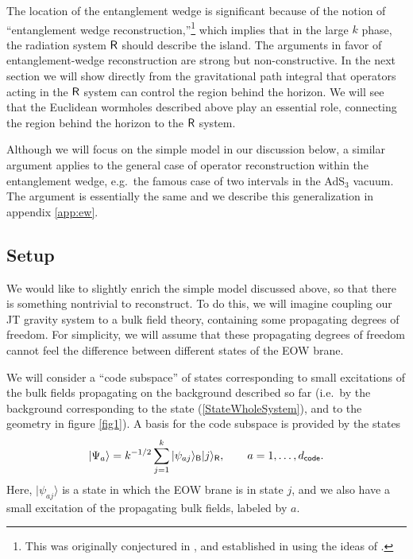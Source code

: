 \documentclass[11pt]{article}
\newcommand{\be}{\begin{equation}}
\newcommand{\ee}{\end{equation}}
\numberwithin{equation}{section}
\begin{document}
The location of the entanglement wedge is significant because of the notion of ``entanglement wedge reconstruction,''\footnote{This was originally conjectured in \cite{Headrick:2014cta,Czech:2012bh,Wall:2012uf}, and established in \cite{Jafferis:2015del,Dong:2016eik,Cotler:2017erl} using the ideas of \cite{Faulkner:2013ana}.} which implies that in the large $k$ phase, the radiation system $\sf{R}$ should describe the island. The arguments in favor of entanglement-wedge reconstruction \cite{Faulkner:2013ana,Jafferis:2015del,Dong:2016eik,Cotler:2017erl} are strong but non-constructive. In the next section we will show directly from the gravitational path integral that operators acting in the $\sf{R}$ system can control the region behind the horizon. We will see that the Euclidean wormholes described above play an essential role, connecting the region behind the horizon to the $\sf{R}$ system.

Although we will focus on the simple model in our discussion below, a similar argument applies to the general case of operator reconstruction within the entanglement wedge, e.g.~the famous case of two intervals in the AdS$_3$ vacuum. The argument is essentially the same and we describe this generalization in appendix \ref{app:ew}.

\subsection{Setup}
We would like to slightly enrich the simple model discussed above, so that there is something nontrivial to reconstruct. To do this, we will imagine coupling our JT gravity system to a bulk field theory, containing some propagating degrees of freedom. For simplicity, we will assume that these propagating degrees of freedom cannot feel the difference between different states of the EOW brane.

We will consider a ``code subspace'' of states corresponding to small excitations of the bulk fields propagating on the background described so far (i.e.~by the background corresponding to the state (\ref{StateWholeSystem}), and to the geometry in figure \ref{fig1}). A basis for the code subspace is provided by the states
\be
|\Psi_a\rangle = k^{-1/2}\sum_{j = 1}^k|\psi_{aj}\rangle_{\sf{B}}|j\rangle_{\sf{R}}, \hspace{20pt} a = 1,\dots,d_{\sf{code}}.
\ee
Here, $|\psi_{aj}\rangle$ is a state in which the EOW brane is in state $j$, and we also have a small excitation of the propagating bulk fields, labeled by $a$. 
\end{document}
